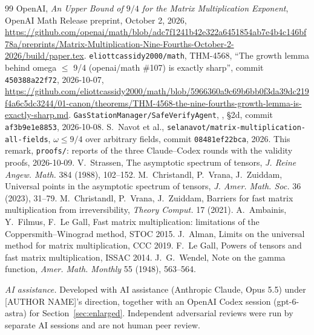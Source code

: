 \documentclass[11pt]{amsart}
\theoremstyle{remark}
\begin{document}
\begin{thebibliography}{99}
 OpenAI, \emph{An Upper Bound of $9/4$ for the Matrix
Multiplication Exponent}, OpenAI Math Release preprint, October 2, 2026,
\url{https://github.com/openai/math/blob/adc7f1241b42e322a6451854ab7e4b4c146bf78a/preprints/Matrix-Multiplication-Nine-Fourths-October-2-2026/build/paper.tex}.
 \texttt{eliottcassidy2000/math}, THM-4568, ``The growth lemma
behind omega $\le$ 9/4 (openai/math \#107) is exactly sharp'', commit
\texttt{450388a22f72}, 2026-10-07,
\url{https://github.com/eliottcassidy2000/math/blob/5966360a9c69b6bb0f3da39dc219f4a6c5dc3244/01-canon/theorems/THM-4568-the-nine-fourths-growth-lemma-is-exactly-sharp.md}.
 \texttt{GasStationManager/SafeVerifyAgent},
, \S2d, commit \texttt{af3b9e1e8853},
2026-10-08.
 S.~Navot et al., \texttt{selanavot/matrix-multiplication-all-fields},
$\omega\le9/4$ over arbitrary fields, commit \texttt{08481ef22bca}, 2026.
 This remark, \texttt{proofs/}: reports of the three
Claude--Codex rounds with the validity proofs, 2026-10-09.
 V.~Strassen, The asymptotic spectrum of tensors,
\emph{J. Reine Angew. Math.} 384 (1988), 102--152.
 M.~Christandl, P.~Vrana, J.~Zuiddam, Universal points in the
asymptotic spectrum of tensors, \emph{J. Amer. Math. Soc.} 36 (2023), 31--79.
 M.~Christandl, P.~Vrana, J.~Zuiddam, Barriers for fast matrix
multiplication from irreversibility, \emph{Theory Comput.} 17 (2021).
 A.~Ambainis, Y.~Filmus, F.~Le Gall, Fast matrix
multiplication: limitations of the Coppersmith--Winograd method, STOC 2015.
 J.~Alman, Limits on the universal method for matrix
multiplication, CCC 2019.
 F.~Le Gall, Powers of tensors and fast matrix multiplication,
ISSAC 2014.
 J.~G.~Wendel, Note on the gamma function, \emph{Amer. Math.
Monthly} 55 (1948), 563--564.
\end{thebibliography}

\bigskip\noindent\emph{AI assistance.} Developed with AI assistance
(Anthropic Claude, Opus 5.5) under [AUTHOR NAME]'s direction, together with
an OpenAI Codex session (gpt-6-astra) for Section~\ref{sec:enlarged}.
Independent adversarial reviews were run by separate AI sessions and are not
human peer review.
\end{document}
